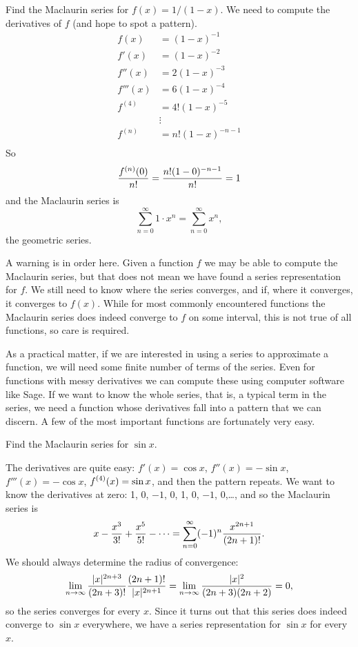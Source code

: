 \begin{example} Find the Maclaurin series for $f(x)=1/(1-x)$. We need to
compute the derivatives of $f$ (and hope to spot a pattern).
\begin{align*}
  f(x)&=(1-x)^{-1} \\
  f'(x)&=(1-x)^{-2} \\
  f''(x)&=2(1-x)^{-3} \\
  f'''(x)&=6(1-x)^{-4} \\
  f^{(4)}&=4!(1-x)^{-5} \\
  &\vdots \\
  f^{(n)}&=n!(1-x)^{-n-1} \\
\end{align*}
So
$${f^{(n)}(0)\over n!}={n!(1-0)^{-n-1}\over n!}=1$$
and the Maclaurin series is
$$\sum_{n=0}^\infty 1\cdot x^n=\sum_{n=0}^\infty x^n,$$
the geometric series.
\end{example}

A warning is in order here. Given a function $f$ we may be able to
compute the Maclaurin series, but that does not mean we have found a
series representation for $f$. We still need to know where the series
converges, and if, where it converges, it converges to $f(x)$. While
for most commonly encountered functions the Maclaurin series does
indeed converge to $f$ on some interval, this is not true of all
functions, so care is required.

As a practical matter, if we are interested in using a series to
approximate a function, we will need some finite number of terms of
the series. Even for functions with messy derivatives we can compute
these using computer software like Sage. If we want to
know the whole series, that is, a typical term in the series, we need
a function whose derivatives fall into a pattern that we can
discern. A few of the most important functions are fortunately very
easy.

\begin{example} Find the Maclaurin series for $\sin x$.

The derivatives are quite easy: $f'(x)=\cos x$, $f''(x)=-\sin x$,
$f'''(x)=-\cos x$, $\displaystyle f^{(4)}(x)=\sin x$, and then the pattern
repeats. We want to know the derivatives at zero:
1, 0, $-1$, 0, 1, 0, $-1$, 0,\dots, and so the Maclaurin series is
$$
  x-{x^3\over 3!}+{x^5\over 5!}-\cdots=
  \sum_{n=0}^\infty (-1)^n{x^{2n+1}\over (2n+1)!}.
$$
We should always determine the radius of convergence:
$$
  \lim_{n\to\infty} {|x|^{2n+3}\over (2n+3)!}{(2n+1)!\over |x|^{2n+1}}
  =\lim_{n\to\infty} {|x|^2\over (2n+3)(2n+2)}=0,
$$
so the series converges for every $x$. Since it turns out that this
series does indeed converge to $\sin x$ everywhere, we have a series
representation for $\sin x$ for every $x$. 
\end{example}

